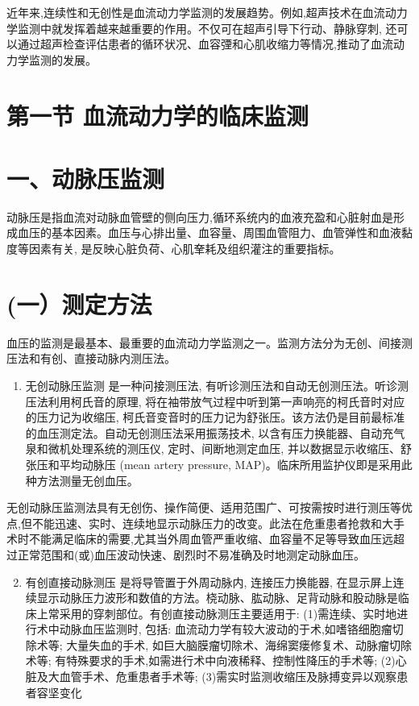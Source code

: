 \documentclass[10pt]{article}
\begin{document}
近年来,连续性和无创性是血流动力学监测的发展趋势。例如,超声技术在血流动力学监测中就发挥着越来越重要的作用。不仅可在超声引导下行动、静脉穿刺, 还可以通过超声检查评估患者的循环状况、血容㢾和心肌收缩力等情况,推动了血流动力学监测的发展。

\section*{第一节 血流动力学的临床监测}
\section*{一、动脉压监测}
动脉压是指血流对动脉血管壁的侧向压力,循环系统内的血液充盈和心脏射血是形成血压的基本因素。血压与心排出量、血容量、周围血管阻力、血管弹性和血液黏度等因素有关, 是反映心脏负荷、心肌羍耗及组织灌注的重要指标。

\section*{(一）测定方法}
血压的监测是最基本、最重要的血流动力学监测之一。监测方法分为无创、间接测压法和有创、直接动脉内测压法。

\begin{enumerate}
  \item 无创动脉压监测 是一种问接测压法, 有听诊测压法和自动无创测压法。听诊测压法利用柯氏音的原理, 将在袖带放气过程中听到第一声响亮的柯氏音时对应的压力记为收缩压, 柯氏音变音时的压力记为舒张压。该方法仍是目前最标准的血压测定法。自动无创测压法采用振荡技术, 以含有压力换能器、自动充气泉和微机处理系统的测压仪, 定时、间断地测定血压, 并以数据显示收缩压、舒张压和平均动脉压 (mean artery pressure, MAP)。临床所用监护仪即是采用此种方法测量无创血压。
\end{enumerate}

无创动脉压监测法具有无创伤、操作简便、适用范围广、可按需按时进行测压等优点,但不能迅速、实时、连续地显示动脉压力的改变。此法在危重患者抢救和大手术时不能满足临床的需要,尤其当外周血管严重收缩、血容量不足等导致血压远超过正常范围和(或)血压波动快速、剧烈时不易准确及时地测定动脉血压。

\begin{enumerate}
  \setcounter{enumi}{1}
  \item 有创直接动脉测压 是将导管置于外周动脉内, 连接压力换能器, 在显示屏上连续显示动脉压力波形和数值的方法。桡动脉、肱动脉、足背动脉和股动脉是临床上常采用的穿刺部位。有创直接动脉测压主要适用于: (1)需连续、实时地进行术中动脉血压监测时, 包括: 血流动力学有较大波动的于术,如嗜铬细胞瘤切除术等; 大量失血的手术, 如巨大脑膜瘤切除术、海绵窦瘘修复术、动脉瘤切除术等; 有特殊要求的手术,如需进行术中向液稀释、控制性降压的手术等; (2)心脏及大血管手术、危重患者手术等; (3)需实时监测收缩压及脉搏变异以观察患者容坚变化
\end{enumerate}
\end{document}
